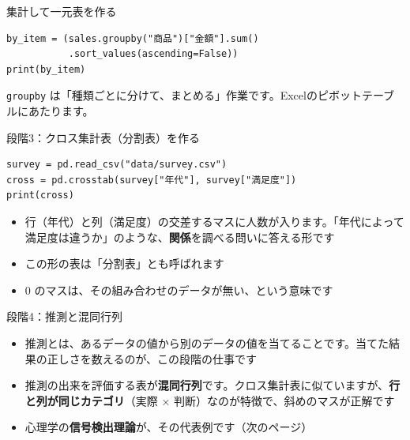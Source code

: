 \documentclass[aspectratio=169,11pt]{beamer}
\begin{document}
\begin{frame}[fragile]{集計して一元表を作る}
\begin{lstlisting}
by_item = (sales.groupby("商品")["金額"].sum()
           .sort_values(ascending=False))
print(by_item)
\end{lstlisting}
\texttt{groupby} は「種類ごとに分けて、まとめる」作業です。Excelのピボットテーブルにあたります。
\end{frame}

\begin{frame}[fragile]{段階3：クロス集計表（分割表）を作る}
\begin{lstlisting}
survey = pd.read_csv("data/survey.csv")
cross = pd.crosstab(survey["年代"], survey["満足度"])
print(cross)
\end{lstlisting}
\begin{itemize}
\item 行（年代）と列（満足度）の交差するマスに人数が入ります。「年代によって満足度は違うか」のような、\textbf{関係}を調べる問いに答える形です
\item この形の表は「分割表」とも呼ばれます
\item 0 のマスは、その組み合わせのデータが無い、という意味です
\end{itemize}
\end{frame}

\begin{frame}[fragile]{段階4：推測と混同行列}
\begin{itemize}
\item 推測とは、あるデータの値から別のデータの値を当てることです。当てた結果の正しさを数えるのが、この段階の仕事です
\item 推測の出来を評価する表が\textbf{混同行列}です。クロス集計表に似ていますが、\textbf{行と列が同じカテゴリ}（実際 × 判断）なのが特徴で、斜めのマスが正解です
\item 心理学の\textbf{信号検出理論}が、その代表例です（次のページ）
\end{itemize}
\end{frame}
\end{document}
